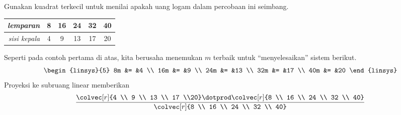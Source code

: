 \begin{exercises}
  \item
    Gunakan kuadrat terkecil untuk menilai apakah uang logam dalam percobaan ini
    seimbang.
    \begin{center}
      \begin{tabular}{r|ccccc}
         \textit{lemparan}  &8  &16  &24  &32  &40 \\
         \hline
         \textit{sisi kepala}  &4  &9   &13  &17  &20
      \end{tabular}
    \end{center}
    \begin{answer}
      Seperti pada contoh pertama di atas, kita berusaha menemukan $m$ terbaik
      untuk ``menyelesaikan'' sistem berikut.
      \begin{equation*}
        \begin{linsys}{5}
          8m  &=  &4  \\
          16m &=  &9  \\
          24m &=  &13 \\
          32m &=  &17 \\
          40m &=  &20
        \end{linsys}
      \end{equation*}
      Proyeksi ke subruang linear memberikan
      \begin{equation*}
        \frac{\colvec[r]{4 \\ 9 \\ 13 \\ 17 \\20}
          \dotprod
          \colvec[r]{8  \\ 16 \\ 24 \\ 32 \\ 40}}{%
          \colvec[r]{8  \\ 16 \\ 24 \\ 32 \\ 40}
}
\end{equation*}
\end{answer}
\end{exercises}
